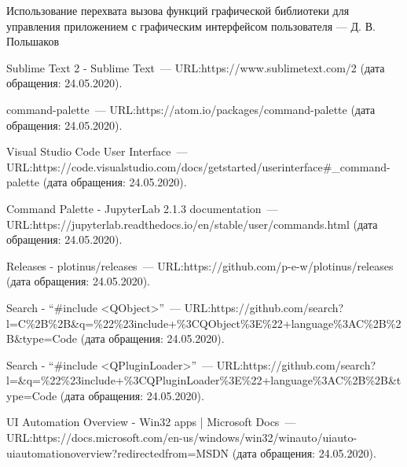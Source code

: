 \renewcommand{\bibname}{Список использованных источников}
\begin{thebibliography}{99}

 Использование перехвата вызова функций графической библиотеки для управления приложением с графическим интерфейсом пользователя --- Д. В. Польшаков

 Sublime Text 2 \-- Sublime Text~---
URL:\@ https://www.sublimetext.com/2
(дата обращения: 24.05.2020).

 command-palette~---
URL:\@ https://atom.io/packages/command-palette
(дата обращения: 24.05.2020).

 Visual Studio Code User Interface~---
URL:\@ https://code.visualstudio.com/docs/getstarted/userinterface\#\_command-palette
(дата обращения: 24.05.2020).

 Command Palette \-- JupyterLab 2.1.3 documentation~---
URL:\@ https://jupyterlab.readthedocs.io/en/stable/user/commands.html
(дата обращения: 24.05.2020).

 Releases \-- plotinus/releases~---
URL:\@  https://github.com/p-e-w/plotinus/releases
(дата обращения: 24.05.2020).

 Search \-- ``\#include <QObject>''~---
URL:\@ https://github.com/search?l=C\%2B\%2B\&q=\%22\%23include+\%3CQObject\%3E\%22+language\%3AC\%2B\%2B\&type=Code
(дата обращения: 24.05.2020).

 Search \-- ``\#include <QPluginLoader>''~---
URL:\@ https://github.com/search?l=\&q=\%22\%23include+\%3CQPluginLoader\%3E\%22+language\%3AC\%2B\%2B\&type=Code
(дата обращения: 24.05.2020).

 UI Automation Overview \-- Win32 apps | Microsoft Docs~---
URL:\@ https://docs.microsoft.com/en-us/windows/win32/winauto/uiauto-uiautomationoverview?redirectedfrom=MSDN
(дата обращения: 24.05.2020).

\end{thebibliography}
